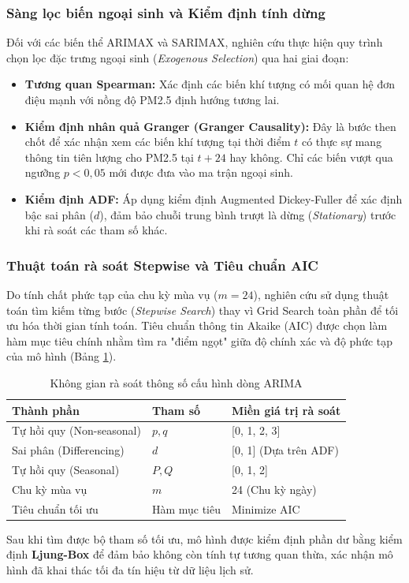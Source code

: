 \subsubsection{Sàng lọc biến ngoại sinh và Kiểm định tính dừng}
Đối với các biến thể ARIMAX và SARIMAX, nghiên cứu thực hiện quy trình chọn lọc đặc trưng ngoại sinh (\textit{Exogenous Selection}) qua hai giai đoạn:
\begin{itemize}
    \item \textbf{Tương quan Spearman:} Xác định các biến khí tượng có mối quan hệ đơn điệu mạnh với nồng độ PM2.5 định hướng tương lai.
    \item \textbf{Kiểm định nhân quả Granger (Granger Causality):} Đây là bước then chốt để xác nhận xem các biến khí tượng tại thời điểm $t$ có thực sự mang thông tin tiên lượng cho PM2.5 tại $t+24$ hay không. Chỉ các biến vượt qua ngưỡng $p < 0,05$ mới được đưa vào ma trận ngoại sinh.
    \item \textbf{Kiểm định ADF:} Áp dụng kiểm định Augmented Dickey-Fuller để xác định bậc sai phân ($d$), đảm bảo chuỗi trung bình trượt là dừng (\textit{Stationary}) trước khi rà soát các tham số khác.
\end{itemize}
\subsubsection{Thuật toán rà soát Stepwise và Tiêu chuẩn AIC}
Do tính chất phức tạp của chu kỳ mùa vụ ($m=24$), nghiên cứu sử dụng thuật toán tìm kiếm từng bước (\textit{Stepwise Search}) thay vì Grid Search toàn phần để tối ưu hóa thời gian tính toán. Tiêu chuẩn thông tin Akaike (AIC) được chọn làm hàm mục tiêu chính nhằm tìm ra "điểm ngọt" giữa độ chính xác và độ phức tạp của mô hình (Bảng \ref{tab:stats_search_space}).
\begin{table}[H]
    \centering
    \caption{Không gian rà soát thông số cấu hình dòng ARIMA}
    \label{tab:stats_search_space}
    \begin{tabular}{|l|l|l|}
    \hline
    \textbf{Thành phần} & \textbf{Tham số} & \textbf{Miền giá trị rà soát} \\ \hline
    Tự hồi quy (Non-seasonal) & $p, q$ & [0, 1, 2, 3] \\
    Sai phân (Differencing)   & $d$    & [0, 1] (Dựa trên ADF) \\
    Tự hồi quy (Seasonal)     & $P, Q$ & [0, 1, 2] \\
    Chu kỳ mùa vụ             & $m$    & 24 (Chu kỳ ngày) \\
    Tiêu chuẩn tối ưu         & Hàm mục tiêu & Minimize AIC \\ \hline
    \end{tabular}
\end{table}
Sau khi tìm được bộ tham số tối ưu, mô hình được kiểm định phần dư bằng kiểm định \textbf{Ljung-Box} để đảm bảo không còn tính tự tương quan thừa, xác nhận mô hình đã khai thác tối đa tín hiệu từ dữ liệu lịch sử.

